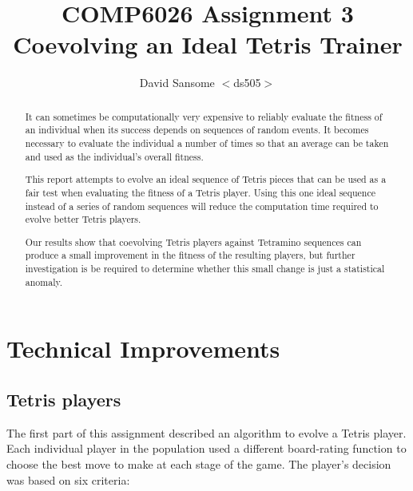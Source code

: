 \documentclass[a4paper,11pt]{article}
\title{COMP6026 Assignment 3 \\
Coevolving an Ideal Tetris Trainer}
\author{David Sansome $<$ds505$>$}
\begin{document}


\maketitle

\begin{abstract}
  It can sometimes be computationally very expensive to reliably evaluate the
  fitness of an individual when its success depends on sequences of random
  events.
  It becomes necessary to evaluate the individual a number of times so that an
  average can be taken and used as the individual's overall fitness.
  
  This report attempts to evolve an ideal sequence of Tetris pieces that can be
  used as a fair test when evaluating the fitness of a Tetris player.
  Using this one ideal sequence instead of a series of random sequences will
  reduce the computation time required to evolve better Tetris players.
  
  Our results show that coevolving Tetris players against Tetramino sequences
  can produce a small improvement in the fitness of the resulting players, but
  further investigation is be required to determine whether this small change
  is just a statistical anomaly.
\end{abstract}

\clearpage
\tableofcontents

\section{Technical Improvements}

\subsection{Tetris players}
\label{players}

The first part of this assignment described an algorithm to evolve a Tetris
player.
Each individual player in the population used a different board-rating function
to choose the best move to make at each stage of the game.
The player's decision was based on six criteria:
\end{document}

